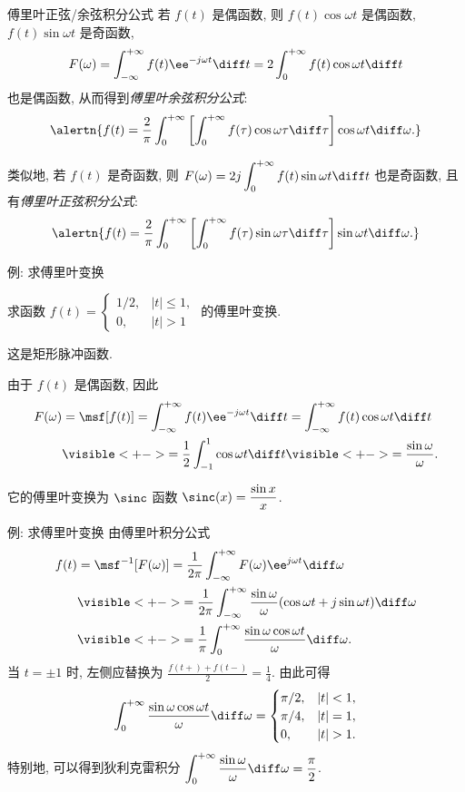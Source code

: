 \begin{frame}{傅里叶正弦/余弦积分公式\noexer}
	\onslide<+->
	若 $f(t)$ 是偶函数, 则 $f(t)\cos{\omega t}$ 是偶函数, $f(t)\sin{\omega t}$ 是奇函数,
	\onslide<+->
	\[F(\omega)=\int_{-\infty}^{+\infty}f(t)\ee^{-j\omega t}\diff t
	=2\int_0^{+\infty} f(t)\cos{\omega t}\diff t
	\]
	也是偶函数,
	\onslide<+->
	从而得到\emph{傅里叶余弦积分公式}:
	\[\alertn{f(t)=\frac2\pi\int_0^{+\infty}\left[\int_0^{+\infty}f(\tau)\cos\omega\tau\diff\tau\right]\cos\omega t\diff\omega.}
	\]

	\onslide<+->
	类似地, 若 $f(t)$ 是奇函数, 则 $\displaystyle F(\omega)=2j\int_0^{+\infty} f(t)\sin{\omega t}\diff t$ 也是奇函数, 且有\emph{傅里叶正弦积分公式}:
	\[\alertn{f(t)=\frac2\pi\int_0^{+\infty}\left[\int_0^{+\infty}f(\tau)\sin \omega\tau\diff\tau\right]\sin\omega t\diff\omega.}
	\]
\end{frame}


\begin{frame}{例: 求傅里叶变换}
	\onslide<+->
	\begin{example}
		求函数 $f(t)=
			\begin{cases}
				1/2, & |t|\le 1,\\
				0, & |t|>1
			\end{cases}$
		的傅里叶变换.
	\end{example}
	\onslide<+->
	这是矩形脉冲函数.
	\onslide<+->
	\begin{solution}
		由于 $f(t)$ 是偶函数, 因此
		\begin{align*}
			F(\omega)&=\msf[f(t)]
			=\int_{-\infty}^{+\infty}f(t)\ee^{-j\omega t}\diff t
			=\int_{-\infty}^{+\infty}f(t)\cos{\omega t}\diff t\\
			&\visible<+->{=\frac12\int_{-1}^1\cos{\omega t}\diff t}
				\visible<+->{=\frac{\sin \omega}{\omega}.}
		\end{align*}
	\end{solution}
	\onslide<+->
	它的傅里叶变换为 $\sinc$ 函数 $\sinc(x)=\dfrac{\sin x}x$.
\end{frame}


\begin{frame}{例: 求傅里叶变换}
	\onslide<+->
	由傅里叶积分公式
	\begin{align*}
		f(t)&=\msf^{-1}[F(\omega)]=\frac1{2\pi}\int_{-\infty}^{+\infty}F(\omega)\ee^{j\omega t}\diff\omega\\
		&\visible<+->{=\frac1{2\pi}\int_{-\infty}^{+\infty}\frac{\sin\omega}{\omega}(\cos\omega t+j\sin\omega t)\diff \omega}\\
		&\visible<+->{=\frac1\pi\int_0^{+\infty}\frac{\sin\omega\cos\omega t}{\omega}\diff \omega.}
	\end{align*}
	\onslide<+->
	当 $t=\pm1$ 时, 左侧应替换为 $\frac{f(t+)+f(t-)}2=\frac14$.
	\onslide<+->
	由此可得
	\[\int_0^{+\infty}\frac{\sin \omega\cos\omega t}\omega\diff\omega=\begin{cases}
		\pi/2,&|t|<1,\\
		\pi/4,&|t|=1,\\
		0,&|t|>1.
	\end{cases}
	\]
	\onslide<+->
	特别地, 可以得到狄利克雷积分
	$\displaystyle\int_0^{+\infty}\frac{\sin\omega}\omega\diff\omega=\frac\pi2$.
\end{frame}


